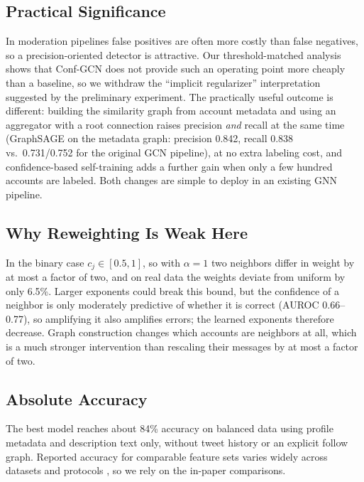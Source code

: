 \documentclass{csimq}
\begin{document}
\subsection{Practical Significance}
In moderation pipelines false positives are often more costly than false negatives, so a precision-oriented detector is attractive. Our threshold-matched analysis shows that Conf-GCN does not provide such an operating point more cheaply than a baseline, so we withdraw the ``implicit regularizer'' interpretation suggested by the preliminary experiment. The practically useful outcome is different: building the similarity graph from account metadata and using an aggregator with a root connection raises precision \emph{and} recall at the same time (GraphSAGE on the metadata graph: precision 0.842, recall 0.838 vs.\ 0.731/0.752 for the original GCN pipeline), at no extra labeling cost, and confidence-based self-training adds a further gain when only a few hundred accounts are labeled. Both changes are simple to deploy in an existing GNN pipeline.

\subsection{Why Reweighting Is Weak Here}
In the binary case $c_j\in[0.5,1]$, so with $\alpha=1$ two neighbors differ in weight by at most a factor of two, and on real data the weights deviate from uniform by only 6.5\%. Larger exponents could break this bound, but the confidence of a neighbor is only moderately predictive of whether it is correct (AUROC 0.66--0.77), so amplifying it also amplifies errors; the learned exponents therefore decrease. Graph construction changes which accounts are neighbors at all, which is a much stronger intervention than rescaling their messages by at most a factor of two.

\subsection{Absolute Accuracy}
The best model reaches about 84\% accuracy on balanced data using profile metadata and description text only, without tweet history or an explicit follow graph. Reported accuracy for comparable feature sets varies widely across datasets and protocols \cite{yang2020scalable,lee2021discriminative}, so we rely on the in-paper comparisons.
\end{document}
